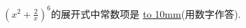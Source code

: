 \documentclass[class=ctexart,crop=false]{standalone}
\begin{document}
$(x^2+\frac{2}{x})^6$的展开式中常数项是 \underline{\hbox to 10mm{}}(用数字作答).
\end{document}
